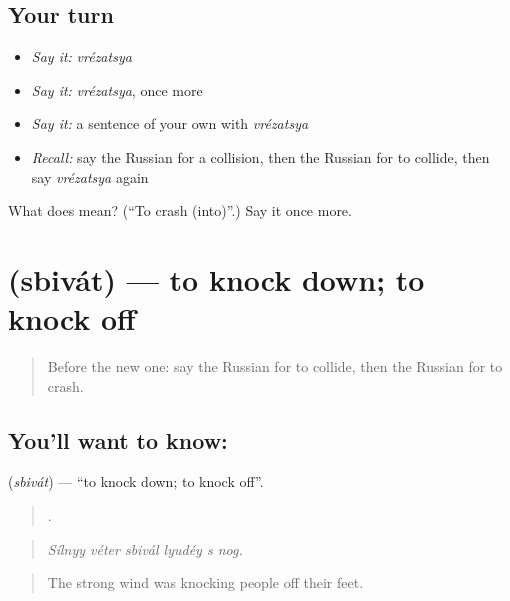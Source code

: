 \subsection*{Your turn}
\begin{itemize}
\raggedright
  \item \emph{Say it:} \emph{vrézatsya}
  \item \emph{Say it:} \emph{vrézatsya}, once more
  \item \emph{Say it:} a sentence of your own with \emph{vrézatsya}
  \item \emph{Recall:} say the Russian for a collision, then the Russian for to collide, then say \emph{vrézatsya} again
\end{itemize}

\begin{tcolorbox}[breakable,colback=teal!4,colframe=teal!35!black,title={Before you move on}]
What does  mean? (\textquotedblleft{}To crash (into)\textquotedblright{}.) Say it once more.
\end{tcolorbox}
\section[\texorpdfstring{\ru{сбивать} (sbivát)}{сбивать (sbivát)}]{ (sbivát) — to knock down; to knock off}

\label{lesson:RU-C410-sbivat}



\begin{quote}
Before the new one: say the Russian for to collide, then the Russian for to crash.
\end{quote}

\subsection*{You'll want to know: }
\textbf{} (\emph{sbivát}) — \textquotedblleft{}to knock down; to knock off\textquotedblright{}.

\begin{quote}
     .
\end{quote}

\begin{quote}
\emph{Sílnyy véter sbivál lyudéy s nog.}
\end{quote}

\begin{quote}
The strong wind was knocking people off their feet.
\end{quote}

